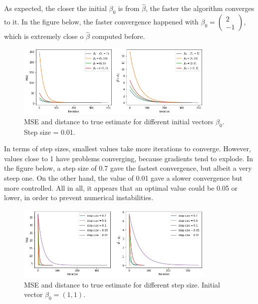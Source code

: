 \documentclass[11pt, english]{article}
\begin{document}
As expected, the closer the initial $\beta_{0}$ is from $\hat{\beta}$, the faster the algorithm converges to it. In the figure below, the faster convergence happened with $\beta_0 = \begin{pmatrix} 2 \\ -1 \end{pmatrix}$, which is extremely close o $\hat{\beta}$ computed before.

\begin{figure}[H]
	\centering
	\includegraphics[width=0.85\textwidth]{GD_iterations_beta0}
	\caption{MSE and distance to true estimate for different initial vectors $\beta_{0}$. Step size = 0.01.}
\end{figure}


In terms of step sizes, smallest values take more iterations to
converge. However, values close to 1 have problems converging, because
gradients tend to explode. In the figure below, a step size of 0.7 gave
the fastest convergence, but albeit a very steep one. On the other hand,
the value of 0.01 gave a slower convergence but more controlled. All in
all, it appears that an optimal value could be 0.05 or lower, in order
to prevent numerical instabilities.

\begin{figure}[H]
	\centering
	\includegraphics[width=0.85\textwidth]{GD_iterations_stepsize}
	\caption{MSE and distance to true estimate for different step size. Initial vector $\beta_{0} = (1,1)$.}
\end{figure}
\end{document}
